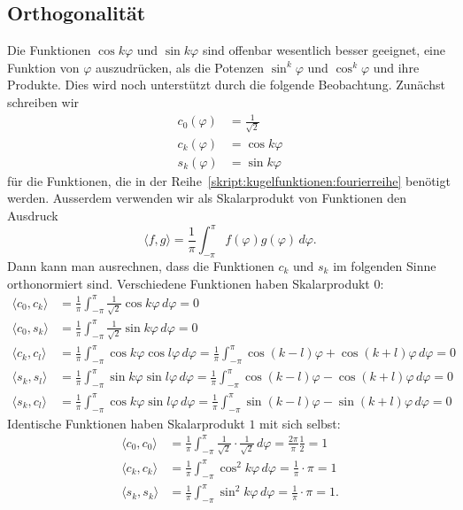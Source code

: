 \subsection{Orthogonalität}
Die Funktionen $\cos k\varphi$ und $\sin k\varphi$ sind offenbar 
wesentlich besser geeignet, eine Funktion von $\varphi$ auszudrücken,
als die Potenzen $\sin^k\varphi$ und $\cos^k\varphi$ und ihre Produkte.
Dies wird noch unterstützt durch die folgende Beobachtung.
Zunächst schreiben wir
\begin{align*}
c_0(\varphi)&=\frac{1}{\sqrt{2}}
\\
c_k(\varphi)&=\cos k\varphi
\\
s_k(\varphi)&=\sin k\varphi
\end{align*}
für die Funktionen, die in der
Reihe~\eqref{skript:kugelfunktionen:fourierreihe}
benötigt werden.
Ausserdem verwenden wir als Skalarprodukt von Funktionen
den Ausdruck
\begin{equation}
\langle f,g\rangle
=
\frac1{\pi}
\int_{-\pi}^{\pi}
f(\varphi)g(\varphi)
\,d\varphi.
\end{equation}
Dann kann man ausrechnen, dass die Funktionen $c_k$ und $s_k$ im
folgenden Sinne orthonormiert sind.
Verschiedene Funktionen haben Skalarprodukt $0$:
\begin{align*}
\langle c_0,c_k\rangle
&=
\frac{1}{\pi}\int_{-\pi}^\pi \frac{1}{\sqrt{2}}\cos k\varphi\,d\varphi=0
\\
\langle c_0,s_k\rangle
&=
\frac{1}{\pi}\int_{-\pi}^\pi \frac{1}{\sqrt{2}}\sin k\varphi\,d\varphi=0
\\
\langle c_k,c_l\rangle
&=
\frac1{\pi}
\int_{-\pi}^{\pi}
\cos k\varphi\cos l\varphi
\,d\varphi
=
\frac1{\pi}
\int_{-\pi}^{\pi}
\cos(k-l)\varphi + \cos(k+l)\varphi
\,d\varphi
=0
\\
\langle s_k,s_l\rangle
&=
\frac1{\pi}
\int_{-\pi}^{\pi}
\sin k\varphi\sin l\varphi
\,d\varphi
=
\frac1{\pi}
\int_{-\pi}^{\pi}
\cos(k-l)\varphi - \cos(k+l)\varphi
\,d\varphi
=0
\\
\langle s_k,c_l\rangle
&=
\frac1{\pi}
\int_{-\pi}^{\pi}
\cos k\varphi\sin l\varphi
\,d\varphi
=
\frac1{\pi}
\int_{-\pi}^{\pi}
\sin(k-l)\varphi - \sin(k+l)\varphi
\,d\varphi
=0
\end{align*}
Identische Funktionen haben Skalarprodukt $1$ mit sich selbst:
\begin{align*}
\langle c_0,c_0\rangle
&=
\frac1{\pi}\int_{-\pi}^{\pi}
\frac1{\sqrt{2}}
\cdot
\frac1{\sqrt{2}}
\,d\varphi = \frac{2\pi}{\pi}\frac12=1
\\
\langle c_k,c_k\rangle
&=
\frac1{\pi}
\int_{-\pi}^{\pi}
\cos^2 k\varphi
\,d\varphi
=
\frac1{\pi}\cdot\pi = 1
\\
\langle s_k,s_k\rangle
&=
\frac1{\pi}
\int_{-\pi}^\pi
\sin^2 k\varphi
\,d\varphi
=\frac1{\pi}\cdot\pi = 1.
\end{align*}
